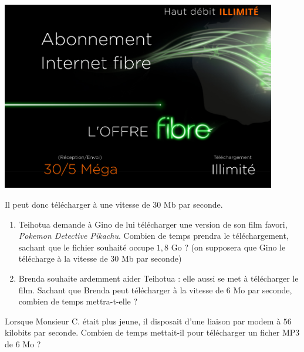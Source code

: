 \documentclass[a4paper]{article}
\begin{document}
\begin{center}
  \includegraphics[width=12cm]{evaluation_2_seconde_15_sujet_A_viti_fibre.png}
\end{center}

Il peut donc télécharger à une vitesse de $30$ Mb par seconde.

\begin{enumerate}
  \item Teihotua demande à Gino de lui télécharger une version de son film favori, \textit{Pokemon Detective Pikachu}. Combien de temps prendra le téléchargement, sachant que le fichier souhaité occupe $1,8$ Go ? (on supposera que Gino le télécharge à la vitesse de $30$ Mb par seconde)
  \item Brenda souhaite ardemment aider Teihotua : elle aussi se met à télécharger le film. Sachant que Brenda peut télécharger à la vitesse de $6$ Mo par seconde, combien de temps mettra-t-elle ?
\end{enumerate}

\bigskip

\exo[2 points]\vspace*{-2mm}
Lorsque Monsieur C. était plus jeune, il disposait d'une liaison par modem à $56$ kilobits par seconde. Combien de temps mettait-il pour télécharger un ficher MP3 de $6$ Mo ?
\end{document}
